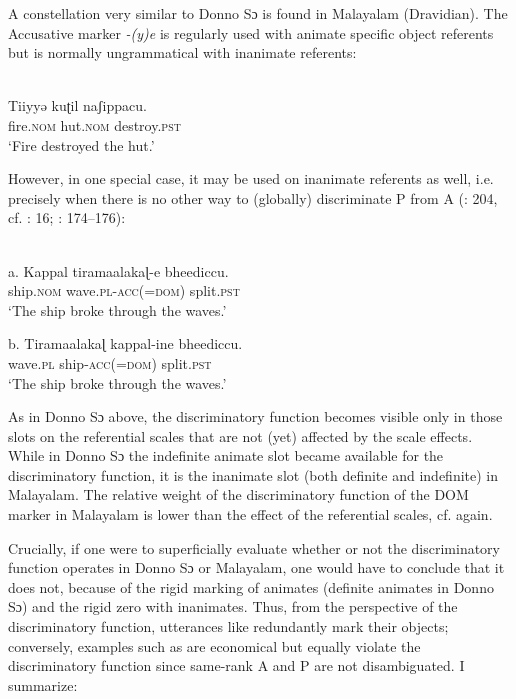\documentclass[output=paper]{langsci/langscibook}
\begin{document}
A constellation very similar to Donno Sɔ is found in Malayalam (Dravidian). The Accusative marker \textit{{}-(y)e} is regularly used with animate specific object referents but is normally ungrammatical with inanimate referents: 

\ea\label{ex:serzant:10}
\\
\gll Tiiyyǝ       kuʈil   naʃippacu.\\
     fire.\textsc{nom}  hut.\textsc{nom}   destroy.\textsc{pst}\\
\glt ‘Fire destroyed the hut.’
\z

However, in one special case, it may be used on inanimate referents as well, i.e. precisely when there is no other way to (globally) discriminate P from A (\citealt{AsherKumari1997}: 204, cf. \citealt{Stiebels2002}: 16; \citealt{Subbārāo2012}: 174\-–176):

\ea\label{ex:serzant:11}
\\
\gll \textup{a.} Kappal   tiramaalakaɭ{}-e   bheediccu.\\
     ship.\textsc{nom}   wave.\textsc{pl-acc(=dom)}  split.\textsc{pst}\\
\glt ‘The ship broke through the waves.’
\z

\ea
\gll \textup{b.} Tiramaalakaɭ kappal-ine     bheediccu.\\
     wave.\textsc{pl}     ship-\textsc{acc(=dom)}   split.\textsc{pst}\\
\glt ‘The ship broke through the waves.’
\z

As in Donno Sɔ above, the discriminatory function becomes visible only in those slots on the referential scales that are not (yet) affected by the scale effects. While in Donno Sɔ the indefinite animate slot became available for the discriminatory function, it is the inanimate slot (both definite and indefinite) in Malayalam. The relative weight of the discriminatory function of the DOM marker in Malayalam is lower than the effect of the referential scales, cf.  again. 

Crucially, if one were to superficially evaluate whether or not the discriminatory function operates in Donno Sɔ or Malayalam, one would have to conclude that it does not, because of the rigid marking of animates (definite animates in Donno Sɔ) and the rigid zero with inanimates. Thus, from the perspective of the discriminatory function, utterances like  redundantly mark their objects; conversely, examples such as  are economical but equally violate the discriminatory function since same-rank A and P are not disambiguated. I summarize:
\end{document}
